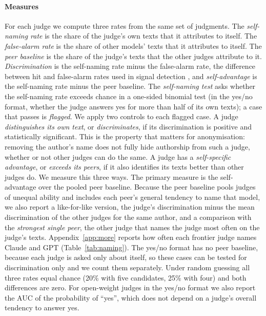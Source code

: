 \paragraph{Measures}
For each judge we compute three rates from the same set of judgments. The
\emph{self-naming rate} is the share of the judge's own texts that it
attributes to itself. The \emph{false-alarm rate} is the share of other models'
texts that it attributes to itself. The \emph{peer baseline} is the share of the
judge's texts that the other judges attribute to it. \emph{Discrimination} is
the self-naming rate minus the false-alarm rate, the difference between hit and
false-alarm rates used in signal detection \citep{green1966signal}, and
\emph{self-advantage} is the self-naming rate minus the peer baseline. The \emph{self-naming test} asks whether the
self-naming rate exceeds chance in a one-sided binomial test (in the yes/no
format, whether the judge answers yes for more than half of its own texts); a
case that passes is \emph{flagged}. We apply two controls to each flagged
case. A judge \emph{distinguishes its own text}, or \emph{discriminates}, if
its discrimination is positive and statistically significant. This is the
property that matters for anonymisation: removing the author's name does not
fully hide authorship from such a judge, whether or not other judges can do
the same. A judge has a \emph{self-specific advantage}, or \emph{exceeds its
peers}, if it also identifies its texts better than other judges do. We
measure this three ways. The primary measure is the self-advantage over the
pooled peer baseline. Because the peer baseline pools judges of unequal
ability and includes each peer's general tendency to name that model, we also
report a like-for-like version, the judge's discrimination minus the mean
discrimination of the other judges for the same author, and a comparison with
the \emph{strongest single peer}, the other judge that names the judge most
often on the judge's texts. Appendix~\ref{app:more} reports how often each
frontier judge names Claude and GPT (Table~\ref{tab:naming}). The yes/no format has no
peer baseline, because each judge is asked only about itself, so these cases
can be tested for discrimination only and we count them separately. Under
random guessing all three rates equal chance (20\% with five
candidates, 25\% with four) and both differences are zero. For open-weight
judges in the yes/no format we also report the AUC of the probability of
``yes'', which does not depend on a judge's overall tendency to answer yes.

